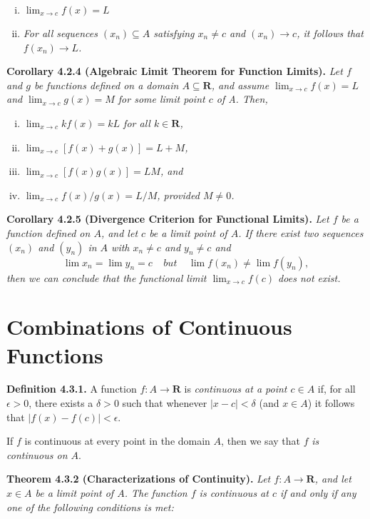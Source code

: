 \documentclass[12pt]{report}
\newcommand{\R}{\textbf{R}}
\begin{document}
\begin{enumerate}[(i)]
\item $\lim_{x\rightarrow c} f(x)=L$
\item \textit{For all sequences $(x_n)\subseteq A$ satisfying $x_n\neq c$ and $(x_n)\rightarrow c$, it follows that $f(x_n)\rightarrow L$.}
\end{enumerate}
\bigskip

\noindent \textbf{Corollary 4.2.4 (Algebraic Limit Theorem for Function Limits).} \textit{Let $f$ and $g$ be functions defined on a domain $A\subseteq\R$, and assume $\lim_{x\rightarrow c} f(x)=L$ and $\lim_{x\rightarrow c} g(x)=M$ for some limit point $c$ of A.  Then,}

\begin{enumerate}[(i)]
\item \textit{$\lim_{x\rightarrow c} kf(x)=kL$ for all $k\in\R$,}
\item \textit{$\lim_{x\rightarrow c} [f(x)+g(x)]=L+M$,}
\item \textit{$\lim_{x\rightarrow c} [f(x)g(x)]=LM$, and}
\item \textit{$\lim_{x\rightarrow c} f(x)/g(x)=L/M$, provided $M\neq 0$.}
\end{enumerate}
\bigskip

\noindent \textbf{Corollary 4.2.5 (Divergence Criterion for Functional Limits).} \textit{Let $f$ be a function defined on $A$, and let $c$ be a limit point of $A$.  If there exist two sequences $(x_n)$ and $(y_n)$ in $A$ with $x_n\neq c$ and $y_n\neq c$ and}
\[\lim x_n=\lim y_n = c\ \ \ \ \ but\ \ \ \ \ \lim f(x_n)\neq\lim f(y_n),\]
\noindent \textit{then we can conclude that the functional limit $\lim_{x\rightarrow c}f(c)$ does not exist.}
\bigskip

\section{Combinations of Continuous Functions}

\noindent \textbf{Definition 4.3.1.}  A function $f:A\rightarrow\R$ is \textit{continuous at a point $c\in A$} if, for all $\epsilon>0$, there exists a $\delta>0$ such that whenever $|x-c|<\delta$ (and $x\in A$) it follows that $|f(x)-f(c)|<\epsilon$.

If $f$ is continuous at every point in the domain $A$, then we say that $f$ \textit{is continuous on $A$}.
\bigskip

\noindent \textbf{Theorem 4.3.2 (Characterizations of Continuity).} \textit{Let $f:A\rightarrow\R$, and let $x\in A$ be a limit point of $A$.  The function $f$ is continuous at $c$ if and only if any one of the following conditions is met:}
\end{document}
